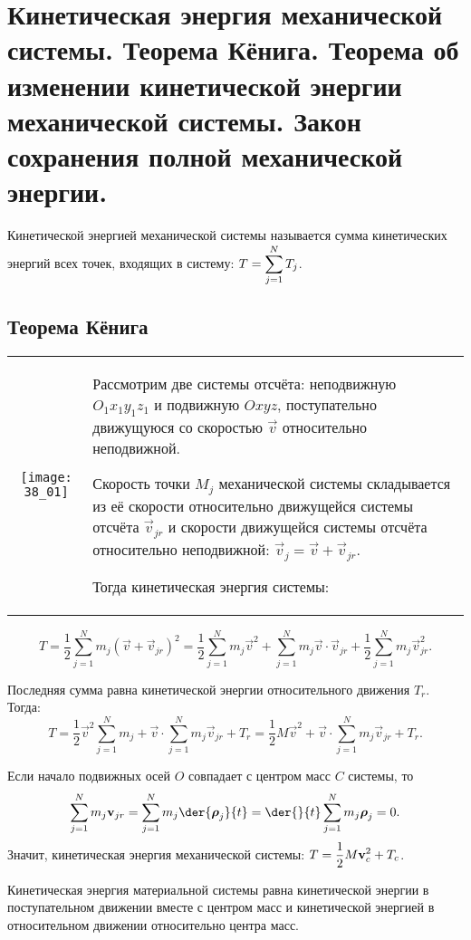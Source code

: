 \chapter{Кинетическая энергия механической системы. Теорема Кёнига. Теорема об
изменении кинетической энергии механической системы. Закон сохранения
полной механической энергии.}

Кинетической энергией механической системы называется сумма кинетических энергий
всех точек, входящих в систему: \( \displaystyle T = \sum_{j=1}^N T_j \).

\section{Теорема Кёнига}
\begin{table}[h!]
\begin{tabular}{C{.4}m{.55\textwidth}}
    \texttt{[image: 38\_01]} &
    Рассмотрим две системы отсчёта: неподвижную \( O_1x_1y_1z_1 \) и подвижную
    \( Oxyz \), поступательно движущуюся со скоростью \( \vec{v} \) относительно
    неподвижной.

    Скорость точки \( M_j \) механической системы складывается из её скорости
    относительно движущейся системы отсчёта \( \vec{v}_{jr} \) и скорости
    движущейся системы отсчёта относительно неподвижной:
    \( \vec{v}_j = \vec{v} + \vec{v}_{jr} \).

Тогда кинетическая энергия системы:
\end{tabular}
\end{table}
\vspace*{-2.5em}
\[
    T = \frac{1}{2}\sum_{j=1}^N m_j(\vec{v} + \vec{v}_{jr})^2 = \frac{1}{2}
    \sum_{j=1}^N m_j\vec{v}^2 + \sum_{j=1}^N m_j\vec{v}\cdot\vec{v}_{jr} +
    \frac{1}{2}\sum_{j=1}^N m_j\vec{v}_{jr}^2.
\]

Последняя сумма равна кинетической энергии относительного движения \( T_r \).
Тогда:
\[
    T = \frac{1}{2}\vec{v}^2\sum_{j=1}^N m_j +
    \vec{v}\cdot\sum_{j=1}^Nm_j\vec{v}_{jr} + T_r =
    \frac{1}{2}M\vec{v}^2 + \vec{v}\cdot\sum_{j=1}^N m_j\vec{v}_{jr} + T_r.
\]

Если начало подвижных осей \( O \) совпадает с центром масс \( C \) системы, то
\[
    \sum_{j=1}^N m_j\vec{v}_{jr} = \sum_{j=1}^N m_j\der{\vec{\rho}_j}{t} =
    \der{}{t}\sum_{j=1}^N m_j\vec{\rho}_j = 0.
\]
Значит, кинетическая энергия механической системы:
\( \displaystyle T = \frac{1}{2}M\boldsymbol{\mathrm{v}}_c^2 + T_c \).

Кинетическая энергия материальной системы равна кинетической энергии в
поступательном движении вместе с центром масс и кинетической энергией в
относительном движении относительно центра масс.

